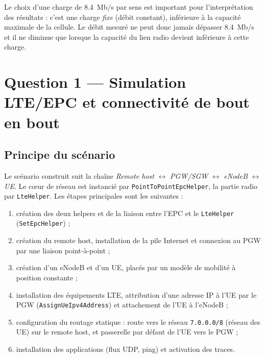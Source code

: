 Le choix d'une charge de \SI{8.4}{Mb/s} par sens est important pour
l'interprétation des résultats : c'est une charge \emph{fixe} (débit constant),
inférieure à la capacité maximale de la cellule. Le débit mesuré ne peut donc
jamais dépasser \SI{8.4}{Mb/s} et il ne diminue que lorsque la capacité du lien
radio devient inférieure à cette charge.

\section{Question 1 --- Simulation LTE/EPC et connectivité de bout en bout}

\subsection{Principe du scénario}

Le scénario construit suit la chaîne
\emph{Remote host} $\leftrightarrow$ \emph{PGW/SGW} $\leftrightarrow$
\emph{eNodeB} $\leftrightarrow$ \emph{UE}. Le cœur de réseau est instancié par
\texttt{PointToPointEpcHelper}, la partie radio par \texttt{LteHelper}. Les
étapes principales sont les suivantes :

\begin{enumerate}[nosep]
\item création des deux helpers et de la liaison entre l'EPC et le
\texttt{LteHelper} (\texttt{SetEpcHelper}) ;
\item création du remote host, installation de la pile Internet et connexion au
PGW par une liaison point-à-point ;
\item création d'un eNodeB et d'un UE, placés par un modèle de mobilité à
position constante ;
\item installation des équipements LTE, attribution d'une adresse IP à l'UE par
le PGW (\texttt{AssignUeIpv4Address}) et attachement de l'UE à l'eNodeB ;
\item configuration du routage statique : route vers le réseau \texttt{7.0.0.0/8}
(réseau des UE) sur le remote host, et passerelle par défaut de l'UE vers le
PGW ;
\item installation des applications (flux UDP, ping) et activation des traces.
\end{enumerate}

